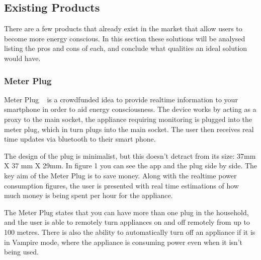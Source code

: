 \documentclass[draft,preprint,12pt,3p]{elsarticle}
\begin{document}
\subsection{Existing Products}

There are a few products that already exist in the market that allow users to become more energy conscious. In this section these solutions will be analysed listing the pros and cons of each, and conclude what qualities an ideal solution would have.

\subsubsection{Meter Plug}

Meter Plug ~\cite{mplug} is a crowdfunded idea to provide realtime information to your smartphone in order to aid energy consciousness. The device works by acting as a proxy to the main socket, the appliance requiring monitoring is plugged into the meter plug, which in turn plugs into the main socket. The user then receives real time updates via bluetooth to their smart phone.

The design of the plug is minimalist, but this doesn't detract from its size: 37mm X 37 mm X 29mm. In figure 1 you can see the app and the plug side by side. The key aim of the Meter Plug is to save money. Along with the realtime power consumption figures, the user is presented with real time estimations of how much money is being spent per hour for the appliance. 

The Meter Plug states that you can have more than one plug in the household, and the user is able to remotely turn appliances on and off remotely from up to 100 metres. There is also the ability to automatically turn off an appliance if it is in Vampire mode, where the appliance is consuming power even when it isn't being used.
\end{document}
